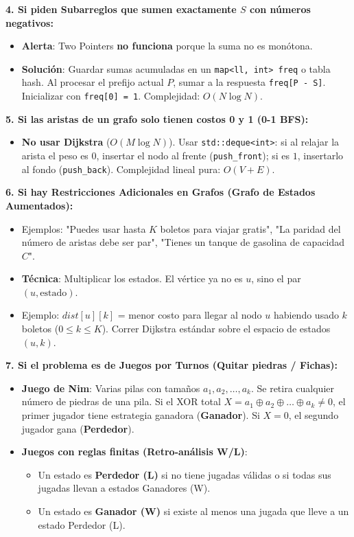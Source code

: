 \documentclass[9pt,twocolumn,a4paper]{extarticle}
\begin{document}
\textbf{4. Si piden Subarreglos que sumen exactamente $S$ con números negativos:}
\begin{itemize}
    \setlength{\itemsep}{0pt}
    \item \textbf{Alerta}: Two Pointers \textbf{no funciona} porque la suma no es monótona.
    \item \textbf{Solución}: Guardar sumas acumuladas en un \texttt{map<ll, int> freq} o tabla hash. Al procesar el prefijo actual $P$, sumar a la respuesta \texttt{freq[P - S]}. Inicializar con \texttt{freq[0] = 1}. Complejidad: $O(N \log N)$.
\end{itemize}

\textbf{5. Si las aristas de un grafo solo tienen costos 0 y 1 (0-1 BFS):}
\begin{itemize}
    \setlength{\itemsep}{0pt}
    \item \textbf{No usar Dijkstra} ($O(M \log N)$). Usar \texttt{std::deque<int>}: si al relajar la arista el peso es $0$, insertar el nodo al frente (\texttt{push\_front}); si es $1$, insertarlo al fondo (\texttt{push\_back}). Complejidad lineal pura: $O(V + E)$.
\end{itemize}

\textbf{6. Si hay Restricciones Adicionales en Grafos (Grafo de Estados Aumentados):}
\begin{itemize}
    \setlength{\itemsep}{0pt}
    \item Ejemplos: "Puedes usar hasta $K$ boletos para viajar gratis", "La paridad del número de aristas debe ser par", "Tienes un tanque de gasolina de capacidad $C$".
    \item \textbf{Técnica}: Multiplicar los estados. El vértice ya no es $u$, sino el par $(u, \text{estado})$.
    \item Ejemplo: $dist[u][k]$ = menor costo para llegar al nodo $u$ habiendo usado $k$ boletos ($0 \le k \le K$). Correr Dijkstra estándar sobre el espacio de estados $(u, k)$.
\end{itemize}

\textbf{7. Si el problema es de Juegos por Turnos (Quitar piedras / Fichas):}
\begin{itemize}
    \setlength{\itemsep}{0pt}
    \item \textbf{Juego de Nim}: Varias pilas con tamaños $a_1, a_2, \dots, a_k$. Se retira cualquier número de piedras de una pila. Si el XOR total $X = a_1 \oplus a_2 \oplus \dots \oplus a_k \ne 0$, el primer jugador tiene estrategia ganadora (\textbf{Ganador}). Si $X = 0$, el segundo jugador gana (\textbf{Perdedor}).
    \item \textbf{Juegos con reglas finitas (Retro-análisis W/L)}:
    \begin{itemize}
        \item Un estado es \textbf{Perdedor (L)} si no tiene jugadas válidas o si todas sus jugadas llevan a estados Ganadores (W).
        \item Un estado es \textbf{Ganador (W)} si existe al menos una jugada que lleve a un estado Perdedor (L).
    \end{itemize}
\end{itemize}
\end{document}
